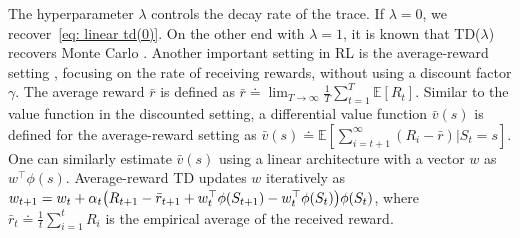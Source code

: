 \documentclass{article}
\newcommand{\E}{\mathbb{E}}
\begin{document}
The hyperparameter $\lambda$ controls the decay rate of the trace.
If $\lambda=0$, we recover~\eqref{eq: linear td(0)}.
On the other end with $\lambda = 1$, 
it is known that TD($\lambda$) recovers Monte Carlo \citep{sutton1988learning}.
Another important setting in RL is the average-reward setting \citep{puterman2014markov,sutton2018reinforcement}, focusing on the rate of receiving rewards, without using a discount factor $\gamma$. 
The average reward $\bar{r}$ is defined as $\bar{r} \doteq \lim_{T \to \infty} \frac{1}{T} \sum_{t=1}^T \E[R_t]$.
Similar to the value function in the discounted setting,
a differential value function $\bar v(s)$ is defined for the average-reward setting as $\bar v(s) \doteq \E\left[\sum_{i=t+1}^\infty (R_i - \bar{r}) | S_t = s\right]$.
One can similarly estimate $\bar v(s)$ using a linear architecture with a vector $w$ as $w^\top \phi(s)$.
Average-reward TD \citep{tsitsiklis1999average} updates $w$ iteratively as
    $w_{t+1} = w_t + \alpha_t \qty(R_{t+1} - \bar{r}_{t+1} + w_t^\top \phi(S_{t+1}) - w_t^\top \phi(S_t)) \phi(S_t)$,
where $\bar r_t \doteq \frac{1}{t}\sum_{i=1}^t R_i$ is the empirical average of the received reward.
\end{document}
